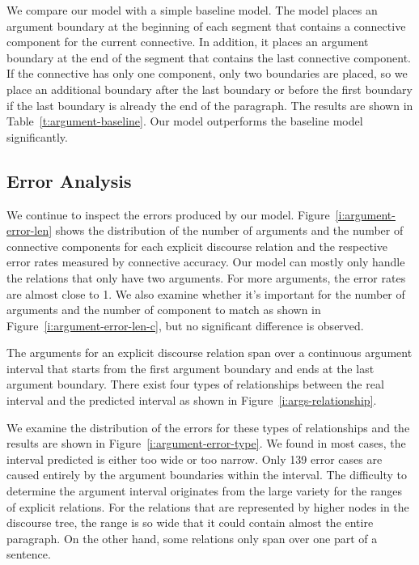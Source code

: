 

We compare our model with a simple baseline model. The model places an argument
boundary at the beginning of each segment that contains a connective component for
the current connective. In addition, it places an argument boundary at the
end of the segment that contains the last connective component. If the connective
has only one component, only two boundaries are placed, so we place an additional
boundary after the last boundary or before the first boundary if
the last boundary is already the end of the paragraph. The results are shown
in Table~\ref{t:argument-baseline}. Our model outperforms the baseline model
significantly.



\subsection{Error Analysis}

We continue to inspect the errors produced by our model.
Figure~\ref{i:argument-error-len} shows the distribution of the number
of arguments and the number of connective components for each explicit discourse
relation and the respective error rates measured by connective accuracy.
Our model can mostly only handle the relations
that only have two arguments. For more arguments, the error rates are almost
close to 1. We also examine whether it's important for
the number of arguments and the number of component to match as shown in
Figure~\ref{i:argument-error-len-c}, but no significant difference is observed.



The arguments for an explicit discourse relation span over a continuous argument interval
that starts from the first argument boundary and ends at the last argument boundary.
There exist four types of relationships between the real interval and the predicted
interval as shown in Figure~\ref{i:args-relationship}.



We examine the distribution of the errors for these types of relationships and the
results are shown in Figure~\ref{i:argument-error-type}. We found in most cases,
the interval predicted is either too wide or too narrow.
Only 139 error cases are caused entirely by the argument boundaries within the
interval. The difficulty to determine the argument interval originates from
the large variety for the ranges of explicit relations. For the relations that
are represented by higher nodes in the discourse tree,
the range is so wide that it could contain almost the entire paragraph.
On the other hand, some relations only span over one part of a sentence.

